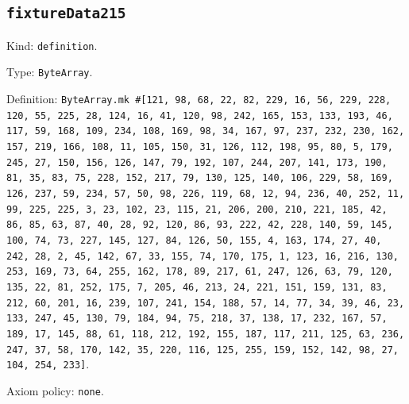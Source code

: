 \documentclass[11pt]{article}
\begin{document}
\subsection*{\texttt{fixtureData215}}
\noindent Kind: \texttt{definition}.\par
\noindent Type: \texttt{ByteArray}.\par
\noindent Definition: \texttt{ByteArray.mk \#[121, 98, 68, 22, 82, 229, 16, 56, 229, 228, 120, 55, 225, 28, 124, 16, 41, 120, 98, 242, 165, 153, 133, 193, 46, 117, 59, 168, 109, 234, 108, 169, 98, 34, 167, 97, 237, 232, 230, 162, 157, 219, 166, 108, 11, 105, 150, 31, 126, 112, 198, 95, 80, 5, 179, 245, 27, 150, 156, 126, 147, 79, 192, 107, 244, 207, 141, 173, 190, 81, 35, 83, 75, 228, 152, 217, 79, 130, 125, 140, 106, 229, 58, 169, 126, 237, 59, 234, 57, 50, 98, 226, 119, 68, 12, 94, 236, 40, 252, 11, 99, 225, 225, 3, 23, 102, 23, 115, 21, 206, 200, 210, 221, 185, 42, 86, 85, 63, 87, 40, 28, 92, 120, 86, 93, 222, 42, 228, 140, 59, 145, 100, 74, 73, 227, 145, 127, 84, 126, 50, 155, 4, 163, 174, 27, 40, 242, 28, 2, 45, 142, 67, 33, 155, 74, 170, 175, 1, 123, 16, 216, 130, 253, 169, 73, 64, 255, 162, 178, 89, 217, 61, 247, 126, 63, 79, 120, 135, 22, 81, 252, 175, 7, 205, 46, 213, 24, 221, 151, 159, 131, 83, 212, 60, 201, 16, 239, 107, 241, 154, 188, 57, 14, 77, 34, 39, 46, 23, 133, 247, 45, 130, 79, 184, 94, 75, 218, 37, 138, 17, 232, 167, 57, 189, 17, 145, 88, 61, 118, 212, 192, 155, 187, 117, 211, 125, 63, 236, 247, 37, 58, 170, 142, 35, 220, 116, 125, 255, 159, 152, 142, 98, 27, 104, 254, 233]}.\par
\noindent Axiom policy: \texttt{none}.\par
\end{document}
